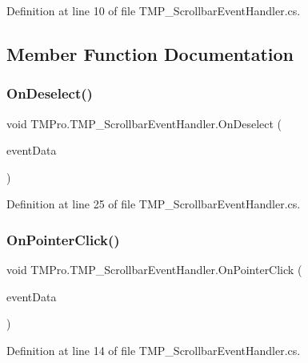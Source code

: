 Definition at line 10 of file T\+M\+P\+\_\+\+Scrollbar\+Event\+Handler.\+cs.



\subsection{Member Function Documentation}
\mbox{\label{class_t_m_pro_1_1_t_m_p___scrollbar_event_handler_ab977fc6cdcb5dbd676e38fb5771d64e3}} 
\subsubsection{\texorpdfstring{OnDeselect()}{OnDeselect()}}
{\footnotesize\ttfamily void T\+M\+Pro.\+T\+M\+P\+\_\+\+Scrollbar\+Event\+Handler.\+On\+Deselect (\begin{DoxyParamCaption}\item[{Base\+Event\+Data}]{event\+Data }\end{DoxyParamCaption})}



Definition at line 25 of file T\+M\+P\+\_\+\+Scrollbar\+Event\+Handler.\+cs.

\mbox{\label{class_t_m_pro_1_1_t_m_p___scrollbar_event_handler_a9138b07ac7dd5c6cd516bc439d7dcafc}} 
\subsubsection{\texorpdfstring{OnPointerClick()}{OnPointerClick()}}
{\footnotesize\ttfamily void T\+M\+Pro.\+T\+M\+P\+\_\+\+Scrollbar\+Event\+Handler.\+On\+Pointer\+Click (\begin{DoxyParamCaption}\item[{Pointer\+Event\+Data}]{event\+Data }\end{DoxyParamCaption})}



Definition at line 14 of file T\+M\+P\+\_\+\+Scrollbar\+Event\+Handler.\+cs.


